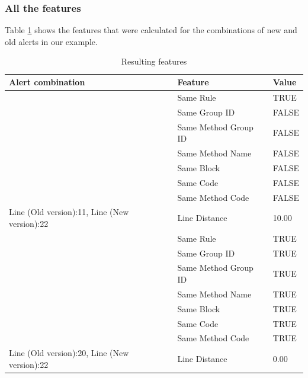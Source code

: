 \documentclass[
]{article}
\begin{document}
\normalsize

\subsubsection {All the features}

Table \ref{table_features} shows the features that were calculated for
the combinations of new and old alerts in our example.

\small

\begin{table}[H]

\caption{\label{tab:unnamed-chunk-13}Resulting features\label{table_features} }
\centering
\begin{tabular}[t]{l|l|l}
\hline
Alert combination & Feature & Value\\
\hline
\rowcolor{gray!6}  \rowcolor{gray!6}   & Same Rule & TRUE\\

 & Same Group ID & FALSE\\

\rowcolor{gray!6}   & Same Method Group ID & FALSE\\

 & Same Method Name & FALSE\\

\rowcolor{gray!6}   & Same Block & FALSE\\

 & Same Code & FALSE\\

\rowcolor{gray!6}   & Same Method Code & FALSE\\

\multirow[t]{-8}{*}{\raggedright\arraybackslash Line (Old version):11, Line (New version):22} & Line Distance & 10.00\\
\cline{1-3}
 & Same Rule & TRUE\\

 & Same Group ID & TRUE\\

\rowcolor{gray!6}   & Same Method Group ID & TRUE\\

 & Same Method Name & TRUE\\

\rowcolor{gray!6}   & Same Block & TRUE\\

 & Same Code & TRUE\\

\rowcolor{gray!6}   & Same Method Code & TRUE\\

\multirow[t]{-8}{*}{\raggedright\arraybackslash Line (Old version):20, Line (New version):22} & Line Distance & 0.00\\
\hline
\end{tabular}
\end{table}
\end{document}
